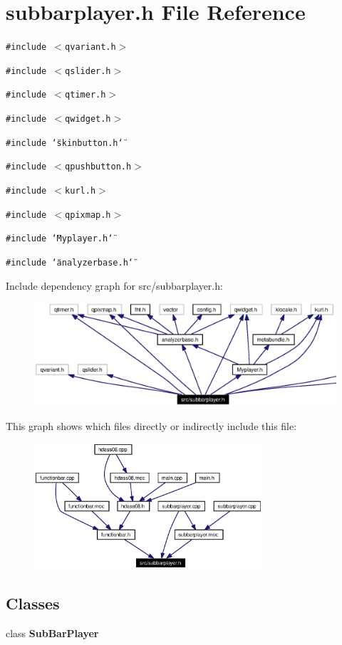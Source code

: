 \section{subbarplayer.h File Reference}
\label{src_2subbarplayer_8h}


{\tt \#include $<$qvariant.h$>$}\par
{\tt \#include $<$qslider.h$>$}\par
{\tt \#include $<$qtimer.h$>$}\par
{\tt \#include $<$qwidget.h$>$}\par
{\tt \#include \char`\"{}skinbutton.h\char`\"{}}\par
{\tt \#include $<$qpushbutton.h$>$}\par
{\tt \#include $<$kurl.h$>$}\par
{\tt \#include $<$qpixmap.h$>$}\par
{\tt \#include \char`\"{}Myplayer.h\char`\"{}}\par
{\tt \#include \char`\"{}analyzerbase.h\char`\"{}}\par


Include dependency graph for src/subbarplayer.h:\begin{figure}[H]
\begin{center}
\leavevmode
\includegraphics[width=389pt]{src_2subbarplayer_8h__incl}
\end{center}
\end{figure}


This graph shows which files directly or indirectly include this file:\begin{figure}[H]
\begin{center}
\leavevmode
\includegraphics[width=240pt]{src_2subbarplayer_8h__dep__incl}
\end{center}
\end{figure}
\subsection*{Classes}
\begin{CompactItemize}
\item 
class {\bf Sub\-Bar\-Player}
\end{CompactItemize}
